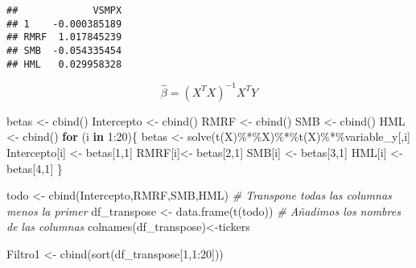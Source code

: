 \documentclass[
]{article}
\newenvironment{Shaded}{\begin{snugshade}}{\end{snugshade}}
\newcommand{\CommentTok}[1]{\textcolor[rgb]{0.56,0.35,0.01}{\textit{#1}}}
\newcommand{\ControlFlowTok}[1]{\textcolor[rgb]{0.13,0.29,0.53}{\textbf{#1}}}
\newcommand{\DecValTok}[1]{\textcolor[rgb]{0.00,0.00,0.81}{#1}}
\newcommand{\FunctionTok}[1]{\textcolor[rgb]{0.00,0.00,0.00}{#1}}
\newcommand{\NormalTok}[1]{#1}
\newcommand{\OtherTok}[1]{\textcolor[rgb]{0.56,0.35,0.01}{#1}}
\newcommand{\SpecialCharTok}[1]{\textcolor[rgb]{0.00,0.00,0.00}{#1}}
\begin{document}
\begin{verbatim}
##             VSMPX
## 1    -0.000385189
## RMRF  1.017845239
## SMB  -0.054335454
## HML   0.029958328
\end{verbatim}

\[
\hat{\beta}=(X^TX)^{-1}X^TY
\]

\begin{Shaded}
\begin{Highlighting}[]
\NormalTok{betas }\OtherTok{\textless{}{-}} \FunctionTok{cbind}\NormalTok{()}
\NormalTok{Intercepto }\OtherTok{\textless{}{-}} \FunctionTok{cbind}\NormalTok{()}
\NormalTok{RMRF }\OtherTok{\textless{}{-}} \FunctionTok{cbind}\NormalTok{()}
\NormalTok{SMB }\OtherTok{\textless{}{-}} \FunctionTok{cbind}\NormalTok{()}
\NormalTok{HML }\OtherTok{\textless{}{-}} \FunctionTok{cbind}\NormalTok{()}
\ControlFlowTok{for}\NormalTok{ (i }\ControlFlowTok{in} \DecValTok{1}\SpecialCharTok{:}\DecValTok{20}\NormalTok{)\{}
\NormalTok{  betas }\OtherTok{\textless{}{-}} \FunctionTok{solve}\NormalTok{(}\FunctionTok{t}\NormalTok{(X)}\SpecialCharTok{\%*\%}\NormalTok{X)}\SpecialCharTok{\%*\%}\FunctionTok{t}\NormalTok{(X)}\SpecialCharTok{\%*\%}\NormalTok{variable\_y[,i]}
\NormalTok{  Intercepto[i] }\OtherTok{\textless{}{-}}\NormalTok{ betas[}\DecValTok{1}\NormalTok{,}\DecValTok{1}\NormalTok{]}
\NormalTok{  RMRF[i]}\OtherTok{\textless{}{-}}\NormalTok{ betas[}\DecValTok{2}\NormalTok{,}\DecValTok{1}\NormalTok{]}
\NormalTok{  SMB[i] }\OtherTok{\textless{}{-}}\NormalTok{ betas[}\DecValTok{3}\NormalTok{,}\DecValTok{1}\NormalTok{]}
\NormalTok{  HML[i] }\OtherTok{\textless{}{-}}\NormalTok{ betas[}\DecValTok{4}\NormalTok{,}\DecValTok{1}\NormalTok{]}
\NormalTok{\}}
\end{Highlighting}
\end{Shaded}

\begin{Shaded}
\begin{Highlighting}[]
\NormalTok{todo }\OtherTok{\textless{}{-}} \FunctionTok{cbind}\NormalTok{(Intercepto,RMRF,SMB,HML)}
\CommentTok{\# Transpone todas las columnas menos la primer}
\NormalTok{df\_transpose }\OtherTok{\textless{}{-}} \FunctionTok{data.frame}\NormalTok{(}\FunctionTok{t}\NormalTok{(todo))}
\CommentTok{\# Añadimos los nombres de las columnas}
\FunctionTok{colnames}\NormalTok{(df\_transpose)}\OtherTok{\textless{}{-}}\NormalTok{tickers}
\end{Highlighting}
\end{Shaded}

\begin{Shaded}
\begin{Highlighting}[]
\NormalTok{Filtro1 }\OtherTok{\textless{}{-}} \FunctionTok{cbind}\NormalTok{(}\FunctionTok{sort}\NormalTok{(df\_transpose[}\DecValTok{1}\NormalTok{,}\DecValTok{1}\SpecialCharTok{:}\DecValTok{20}\NormalTok{]))}
\end{Highlighting}
\end{Shaded}
\end{document}
